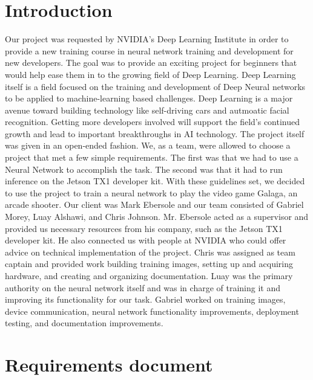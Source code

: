 \documentclass[onecolumn, draftclsnofoot,10pt, compsoc]{IEEEtran}
\begin{document}
\newpage
{}
\tableofcontents

\section{Introduction}
Our project was requested by NVIDIA's Deep Learning Institute in order to provide a new training course in neural network training and development for new developers.
The goal was to provide an exciting project for beginners that would help ease them in to the growing field of Deep Learning.
Deep Learning itself is a field focused on the training and development of Deep Neural networks to be applied to machine-learning based challenges.
Deep Learning is a major avenue toward building technology like self-driving cars and autmoatic facial recognition. 
Getting more developers involved will support the field's continued growth and lead to important breakthroughs in AI technology.
\newline\newline
The project itself was given in an open-ended fashion.
We, as a team, were allowed to choose a project that met a few simple requirements.
The first was that we had to use a Neural Network to accomplish the task. 
The second was that it had to run inference on the Jetson TX1 developer kit.
With these guidelines set, we decided to use the project to train a neural network to play the video game Galaga, an arcade shooter.
\newline\newline
Our client was Mark Ebersole and our team consisted of Gabriel Morey, Luay Alshawi, and Chris Johnson. 
Mr. Ebersole acted as a supervisor and provided us necessary resources from his company, such as the Jetson TX1 developer kit.
He also connected us with people at NVIDIA who could offer advice on technical implementation of the project.
Chris was assigned as team captain and provided work building training images, setting up and acquiring hardware, and creating and organizing documentation.
Luay was the primary authority on the neural network itself and was in charge of training it and improving its functionality for our task.
Gabriel worked on training images, device communication, neural network functionality improvements, deployment testing, and documentation improvements.

\section{Requirements document}
\end{document}
